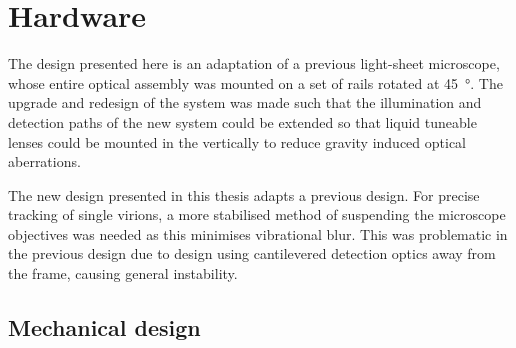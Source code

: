 \section{Hardware}

The design presented here is an adaptation of a previous \gls{light-sheet} microscope, whose entire optical assembly was mounted on a set of rails rotated at \SI{45}{\degree}.
The upgrade and redesign of the system was made such that the illumination and detection paths of the new system could be extended so that liquid tuneable lenses could be mounted in the vertically to reduce gravity induced optical aberrations.

The new design presented in this thesis adapts a previous design.
For precise tracking of single virions, a more stabilised method of suspending the microscope objectives was needed as this minimises vibrational blur.
This was problematic in the previous design due to design using cantilevered detection optics away from the frame, causing general instability.

\subsection{Mechanical design}


